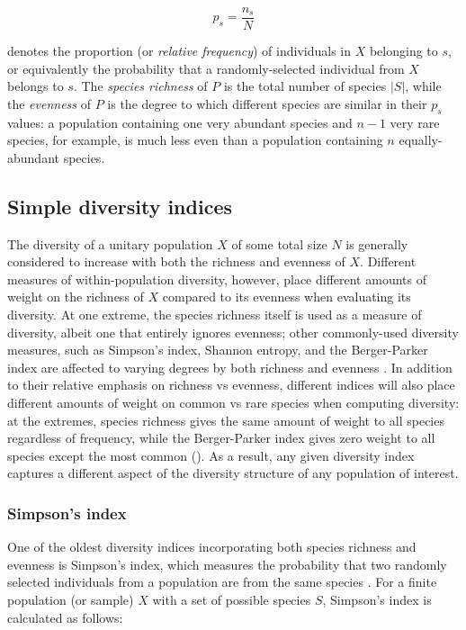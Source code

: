\begin{equation}
p_s = \frac{n_s}{N}
\label{eq:species_proportion}
\end{equation}

\noindent denotes the proportion (or \textit{relative frequency}) of individuals in $X$ belonging to $s$, or equivalently the probability that a randomly-selected individual from $X$ belongs to $s$. The \textit{species richness} of $P$ is the total number of species $|S|$, while the \textit{evenness} of $P$ is the degree to which different species are similar in their $p_s$ values: a population containing one very abundant species and $n-1$ very rare species, for example, is much less even than a population containing $n$ equally-abundant species.

\subsection{Simple diversity indices}
\label{app:diversity-unitary-simple}

The diversity of a unitary population $X$ of some total size $N$ is generally considered to increase with both the richness and evenness of $X$. Different measures of within-population diversity, however, place different amounts of weight on the richness of $X$ compared to its evenness when evaluating its diversity. At one extreme, the species richness itself is used as a measure of diversity, albeit one that entirely ignores evenness; other commonly-used diversity measures, such as Simpson's index, Shannon entropy, and the Berger-Parker index are affected to varying degrees by both richness and evenness \parencite{peet1974diversity,berger1970diversity}. In addition to their relative emphasis on richness vs evenness, different indices will also place different amounts of weight on common vs rare species when computing diversity: at the extremes, species richness gives the same amount of weight to all species regardless of frequency, while the Berger-Parker index gives zero weight to all species except the most common (). As a result, any given diversity index captures a different aspect of the diversity structure of any population of interest.

\subsubsection{Simpson's index}

One of the oldest diversity indices incorporating both species richness and evenness is Simpson's index, which measures the probability that two randomly selected individuals from a population are from the same species \citep{simpson1949diversity}. For a finite population (or sample) $X$ with a set of possible species $S$, Simpson's index is calculated as follows:

